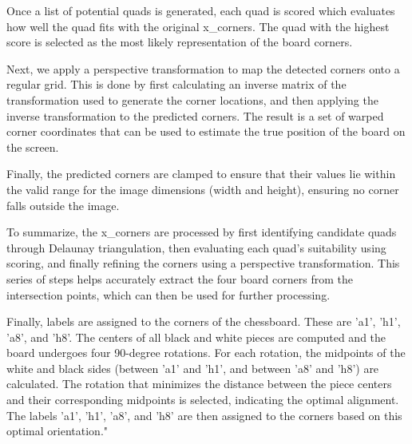Once a list of potential quads is generated, each quad is scored which evaluates how well the quad fits with the original x_corners. The quad with the highest score is selected as the most likely representation of the board corners.

Next, we apply a perspective transformation to map the detected corners onto a regular grid. This is done by first calculating an inverse matrix of the transformation used to generate the corner locations, and then applying the inverse transformation to the predicted corners. The result is a set of warped corner coordinates that can be used to estimate the true position of the board on the screen.

Finally, the predicted corners are clamped to ensure that their values lie within the valid range for the image dimensions (width and height), ensuring no corner falls outside the image.

To summarize, the x_corners are processed by first identifying candidate quads through Delaunay triangulation, then evaluating each quad's suitability using scoring, and finally refining the corners using a perspective transformation. This series of steps helps accurately extract the four board corners from the intersection points, which can then be used for further processing.

Finally, labels are assigned to the corners of the chessboard. These are 'a1', 'h1', 'a8', and 'h8'. The centers of all black and white pieces are computed and the board undergoes four 90-degree rotations. For each rotation, the midpoints of the white and black sides (between 'a1' and 'h1', and between 'a8' and 'h8') are calculated. The rotation that minimizes the distance between the piece centers and their corresponding midpoints is selected, indicating the optimal alignment. The labels 'a1', 'h1', 'a8', and 'h8' are then assigned to the corners based on this optimal orientation."

